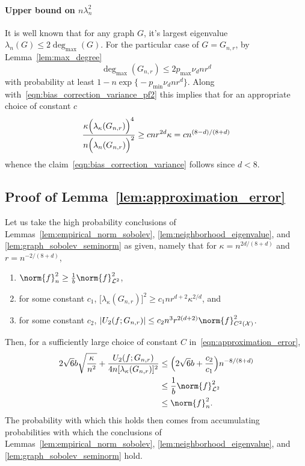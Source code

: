 \documentclass{article}
\newcommand{\abs}[1]{\left \lvert #1 \right \rvert}
\newcommand{\1}{\mathbf{1}}
\newcommand{\Xset}{\mathcal{X}}
\newcommand{\Leb}{\mathcal{L}}
\theoremstyle{alden}
\theoremstyle{aldenthm}
\theoremstyle{definition}
\theoremstyle{remark}
\begin{document}
\paragraph{Upper bound on $n \lambda_n^2$}
It is well known that for any graph $G$, it's largest eigenvalue $\lambda_n(G) \leq 2 \deg_{\max}(G)$. For the particular case of $G = G_{n,r}$, by Lemma~\ref{lem:max_degree}
\begin{equation*}
\deg_{\max}(G_{n,r}) \leq 2 p_{\max} \nu_d n r^d
\end{equation*}
with probability at least $1 -  n \exp\bigl\{- p_{\min} \nu_d n r^d \bigr\}$. Along with~\eqref{eqn:bias_correction_variance_pf2} this implies that for an appropriate choice of constant $c$
\begin{equation*}
\frac{\kappa \Bigl(\lambda_{\kappa}(G_{n,r})\Bigr)^4}{n \Bigl(\lambda_{n}(G_{n,r})\Bigr)^2} \geq c n r^{2d} \kappa = c n^{(8 - d)/(8 + d)}
\end{equation*}
whence the claim~\eqref{eqn:bias_correction_variance} follows since $d < 8$.

\subsection{Proof of Lemma~\ref{lem:approximation_error}}
Let us take the high probability conclusions of Lemmas~\ref{lem:empirical_norm_sobolev}, \ref{lem:neighborhood_eigenvalue}, and \ref{lem:graph_sobolev_seminorm} as given, namely that for $\kappa = n^{2d/(8 + d)}$ and $r = n^{-2/(8 + d)}$,
\begin{enumerate}
	\item $\norm{f}_n^2 \geq \frac{1}{b} \norm{f}_{\Leb^2}^2$,
	\item for some constant $c_1$, $\bigl[\lambda_{\kappa}(G_{n,r})\bigr]^2 \geq c_1 n r^{d + 2} \kappa^{2/d}$, and
	\item for some constant $c_2$, $\abs{U_2(f;G_{n,r})} \leq c_2 n^3 r^{2(d + 2)} \norm{f}_{C^2(\Xset)}^2$.
\end{enumerate}
Then, for a sufficiently large choice of constant $C$ in~\eqref{eqn:approximation_error},
\begin{align*}
2 \sqrt{6} b\sqrt{\frac{\kappa}{n^2}} + \frac{U_2(f;G_{n,r})}{4 n [\lambda_{\kappa}(G_{n,r})]^2} & \leq \Bigl(2 \sqrt{6} b + \frac{c_2}{c_1}\Bigr) n^{-8/(8 + d)} \\
& \leq \frac{1}{b}\norm{f}_{\Leb^2}^2 \\
& \leq \norm{f}_n^2.
\end{align*}
The probability with which this holds then comes from accumulating probabilities with which the conclusions of Lemmas~\ref{lem:empirical_norm_sobolev}, \ref{lem:neighborhood_eigenvalue}, and \ref{lem:graph_sobolev_seminorm} hold.
\end{document}
